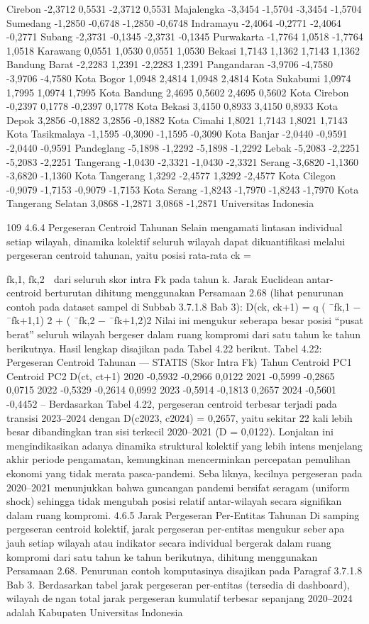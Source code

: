 Cirebon -2,3712 0,5531 -2,3712 0,5531
Majalengka -3,3454 -1,5704 -3,3454 -1,5704
Sumedang -1,2850 -0,6748 -1,2850 -0,6748
Indramayu -2,4064 -0,2771 -2,4064 -0,2771
Subang -2,3731 -0,1345 -2,3731 -0,1345
Purwakarta -1,7764 1,0518 -1,7764 1,0518
Karawang 0,0551 1,0530 0,0551 1,0530
Bekasi 1,7143 1,1362 1,7143 1,1362
Bandung Barat -2,2283 1,2391 -2,2283 1,2391
Pangandaran -3,9706 -4,7580 -3,9706 -4,7580
Kota Bogor 1,0948 2,4814 1,0948 2,4814
Kota Sukabumi 1,0974 1,7995 1,0974 1,7995
Kota Bandung 2,4695 0,5602 2,4695 0,5602
Kota Cirebon -0,2397 0,1778 -0,2397 0,1778
Kota Bekasi 3,4150 0,8933 3,4150 0,8933
Kota Depok 3,2856 -0,1882 3,2856 -0,1882
Kota Cimahi 1,8021 1,7143 1,8021 1,7143
Kota Tasikmalaya -1,1595 -0,3090 -1,1595 -0,3090
Kota Banjar -2,0440 -0,9591 -2,0440 -0,9591
Pandeglang -5,1898 -1,2292 -5,1898 -1,2292
Lebak -5,2083 -2,2251 -5,2083 -2,2251
Tangerang -1,0430 -2,3321 -1,0430 -2,3321
Serang -3,6820 -1,1360 -3,6820 -1,1360
Kota Tangerang 1,3292 -2,4577 1,3292 -2,4577
Kota Cilegon -0,9079 -1,7153 -0,9079 -1,7153
Kota Serang -1,8243 -1,7970 -1,8243 -1,7970
Kota Tangerang Selatan 3,0868 -1,2871 3,0868 -1,2871
Universitas Indonesia

109
4.6.4 Pergeseran Centroid Tahunan
Selain mengamati lintasan individual setiap wilayah, dinamika kolektif seluruh
wilayah dapat dikuantifikasi melalui pergeseran centroid tahunan, yaitu posisi rata-rata
ck =

fk,1, fk,2

dari seluruh skor intra Fk pada tahun k. Jarak Euclidean antar-centroid
berturutan dihitung menggunakan Persamaan 2.68 (lihat penurunan contoh pada dataset
sampel di Subbab 3.7.1.8 Bab 3):
D(ck, ck+1) = q
(
¯fk,1 − ¯fk+1,1)
2 + ( ¯fk,2 − ¯fk+1,2)2
Nilai ini mengukur seberapa besar posisi “pusat berat” seluruh wilayah bergeser dalam
ruang kompromi dari satu tahun ke tahun berikutnya. Hasil lengkap disajikan pada
Tabel 4.22 berikut.
Tabel 4.22: Pergeseran Centroid Tahunan — STATIS (Skor Intra Fk)
Tahun Centroid PC1 Centroid PC2 D(ct, ct+1)
2020 -0,5932 -0,2966 0,0122
2021 -0,5999 -0,2865 0,0715
2022 -0,5329 -0,2614 0,0992
2023 -0,5914 -0,1813 0,2657
2024 -0,5601 -0,4452 –
Berdasarkan Tabel 4.22, pergeseran centroid terbesar terjadi pada transisi 2023–2024
dengan D(c2023, c2024) = 0,2657, yaitu sekitar 22 kali lebih besar dibandingkan transisi terkecil 2020–2021 (D = 0,0122). Lonjakan ini mengindikasikan adanya dinamika
struktural kolektif yang lebih intens menjelang akhir periode pengamatan, kemungkinan
mencerminkan percepatan pemulihan ekonomi yang tidak merata pasca-pandemi. Sebaliknya, kecilnya pergeseran pada 2020–2021 menunjukkan bahwa guncangan pandemi
bersifat seragam (uniform shock) sehingga tidak mengubah posisi relatif antar-wilayah
secara signifikan dalam ruang kompromi.
4.6.5 Jarak Pergeseran Per-Entitas Tahunan
Di samping pergeseran centroid kolektif, jarak pergeseran per-entitas mengukur seberapa jauh setiap wilayah atau indikator secara individual bergerak dalam ruang kompromi
dari satu tahun ke tahun berikutnya, dihitung menggunakan Persamaan 2.68. Penurunan
contoh komputasinya disajikan pada Paragraf 3.7.1.8 Bab 3.
Berdasarkan tabel jarak pergeseran per-entitas (tersedia di dashboard), wilayah dengan total jarak pergeseran kumulatif terbesar sepanjang 2020–2024 adalah Kabupaten
Universitas Indonesia

